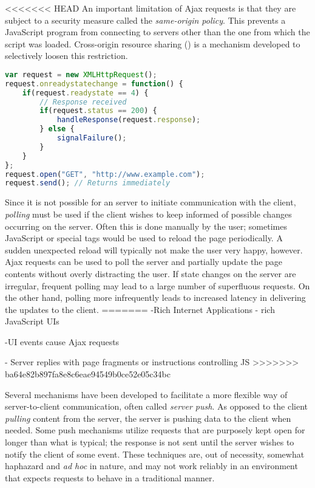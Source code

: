 <<<<<<< HEAD
An important limitation of Ajax requests is that they are subject to a security measure called the \emph{same-origin policy}. This prevents a JavaScript program from connecting to servers other than the one from which the script was loaded. Cross-origin resource sharing () is a mechanism developed to selectively loosen this restriction.

\begin{code}
\begin{lstlisting}[language=JavaScript,caption=Making an Ajax request.\label{listing:ajax}]
var request = new XMLHttpRequest();
request.onreadystatechange = function() {
    if(request.readystate == 4) {
        // Response received
        if(request.status == 200) {
            handleResponse(request.response);
        } else {
            signalFailure();
        }
    }
};
request.open("GET", "http://www.example.com");
request.send(); // Returns immediately
\end{lstlisting}
\end{code}

Since it is not possible for an  server to initiate communication with the client, \emph{polling} must be used if the client wishes to keep informed of possible changes occurring on the server. Often this is done manually by the user; sometimes JavaScript or special  tags would be used to reload the page periodically. A sudden unexpected reload will typically not make the user very happy, however. Ajax requests can be used to poll the server and partially update the page contents without overly distracting the user. If state changes on the server are irregular, frequent polling may lead to a large number of superfluous requests. On the other hand, polling more infrequently leads to increased latency in delivering the updates to the client.
=======
-Rich Internet Applications - rich JavaScript UIs

-UI events cause Ajax requests

- Server replies with page fragments or instructions controlling JS
>>>>>>> ba64e82b897fa8e8c6eae94549b0ce52e05c34bc

Several mechanisms have been developed to facilitate a more flexible way of server-to-client communication, often called \emph{server push}. As opposed to the client \emph{pulling} content from the server, the server is pushing data to the client when needed. Some push mechanisms utilize  requests that are purposely kept open for longer than what is typical; the response is not sent until the server wishes to notify the client of some event. These techniques are, out of necessity, somewhat haphazard and \emph{ad hoc} in nature, and may not work reliably in an environment that expects  requests to behave in a traditional manner.

